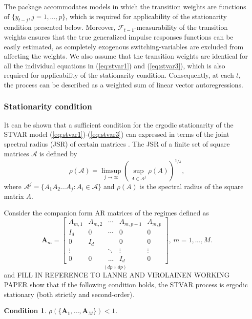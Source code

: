 \documentclass[nojss]{jss}
\newtheorem{condition}{Condition}
\begin{document}
The package  accommodates models in which the transition weights are functions of $\lbrace y_{t-j}, j=1,...,p \rbrace$, which is required for applicability of the stationarity condition presented below. Moreover, $\mathcal{F}_{t-1}$-measurability of the transition weights ensures that the true generalized impulse responses functions \citep{Koop+Pesaran+Potter:1996} can be easily estimated, as completely exogenous switching-variables are excluded from affecting the weights. We also assume that the transition weights are identical for all the individual equations in (\ref{eq:stvar1}) and (\ref{eq:stvar3}), which is also required for applicability of the stationarity condition. Consequently, at each $t$‚ the process can be described as a weighted sum of linear vector autoregressions.

\subsubsection{Stationarity condition}\label{sec:stationarity}
It can be shown that a sufficient condition for the ergodic stationarity of the STVAR model (\ref{eq:stvar1})-(\ref{eq:stvar3}) can expressed in terms of the joint spectral radius (JSR) of certain matrices \citep{Kheifets+Saikkonen:2020}. The JSR of a finite set of square matrices $\mathcal{A}$ is defined by
\begin{equation}
\rho(\mathcal{A}) = \underset{j\rightarrow \infty}{\limsup}\left(\underset{A\in \mathcal{A}^j}{\sup}\rho(A) \right)^{1/j},
\end{equation}
where $\mathcal{A}^j=\lbrace A_1A_2...A_j:A_i\in\mathcal{A}\rbrace$ and $\rho(A)$ is the spectral radius of the square matrix $A$.

Consider the companion form AR matrices of the regimes defined as
\begin{equation}\label{eq:boldA}
\boldsymbol{A}_m =
\underset{(dp\times dp)}{\begin{bmatrix}
A_{m,1} & A_{m,2} & \cdots & A_{m,p-1} & A_{m,p} \\
I_d  & 0     & \cdots & 0            & 0 \\
0     & I_d  &             & 0            & 0 \\
\vdots &   & \ddots & \vdots    & \vdots \\
0     & 0     & \hdots & I_d         & 0
\end{bmatrix}}, \
m=1,...,M.
\end{equation}
\citet[][Theorem 1]{Kheifets+Saikkonen:2020} and FILL IN REFERENCE TO LANNE AND VIROLAINEN WORKING PAPER show that if the following condition holds, the STVAR process is ergodic stationary (both strictly and second-order).
\begin{condition}\label{cond:sufficient}
$\rho(\lbrace \boldsymbol{A}_1,...,\boldsymbol{A}_M \rbrace) < 1$.
\end{condition}
\end{document}
